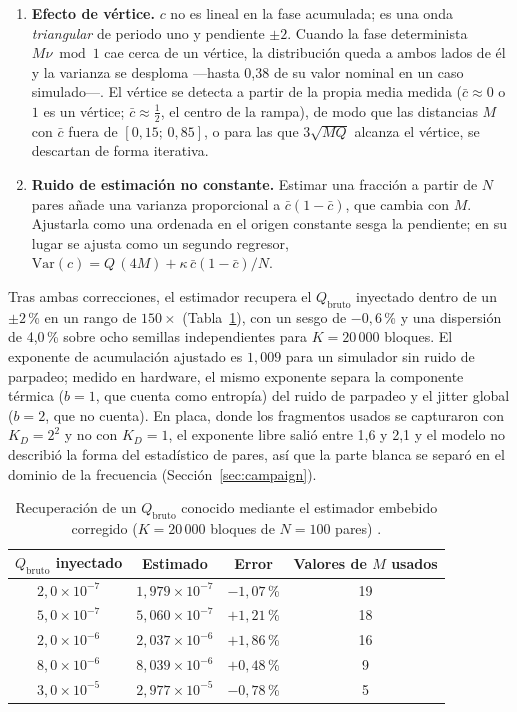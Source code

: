 \begin{enumerate}
\item \textbf{Efecto de vértice.} $c$ no es lineal en la fase acumulada;
es una onda \emph{triangular} de periodo uno y pendiente $\pm2$. Cuando la
fase determinista $M\nu \bmod 1$ cae cerca de un vértice, la distribución
queda a ambos lados de él y la varianza se desploma ---hasta 0,38 de su
valor nominal en un caso simulado---. El vértice se detecta a partir de la
propia media medida ($\bar c \approx 0$ o $1$ es un vértice;
$\bar c \approx \tfrac12$, el centro de la rampa), de modo que las
distancias $M$ con $\bar c$ fuera de $[0{,}15;\,0{,}85]$, o para las que
$3\sqrt{MQ}$ alcanza el vértice, se descartan de forma iterativa.
\item \textbf{Ruido de estimación no constante.} Estimar una fracción a
partir de $N$ pares añade una varianza proporcional a $\bar c(1-\bar c)$,
que cambia con $M$. Ajustarla como una ordenada en el origen constante
sesga la pendiente; en su lugar se ajusta como un segundo regresor,
$\mathrm{Var}(c) = Q\,(4M) + \kappa\,\bar c(1-\bar c)/N$.
\end{enumerate}

Tras ambas correcciones, el estimador recupera el $Q_{\mathrm{bruto}}$
inyectado dentro de un $\pm2$\,\% en un rango de $150\times$
(Tabla~\ref{tab:estimator}), con un sesgo de $-0{,}6$\,\% y una dispersión
de 4,0\,\% sobre ocho semillas independientes para $K=20\,000$ bloques. El
exponente de acumulación ajustado es $1{,}009$ para un simulador sin ruido
de parpadeo; medido en hardware, el mismo exponente separa la componente
térmica ($b=1$, que cuenta como entropía) del ruido de parpadeo y el
jitter global ($b=2$, que no cuenta). En placa, donde los fragmentos usados
se capturaron con $K_D = 2^2$ y no con $K_D = 1$, el exponente libre salió
entre 1,6 y 2,1 \meas{} y el modelo no describió la forma del estadístico
de pares, así que la parte blanca se separó en el dominio de la frecuencia
(Sección~\ref{sec:campaign}).

\begin{table}[htbp]
\centering
\caption{Recuperación de un $Q_{\mathrm{bruto}}$ conocido mediante el
estimador embebido corregido ($K=20\,000$ bloques de $N=100$ pares)
\simu{}.}
\label{tab:estimator}
\begin{tabular}{@{}cccc@{}}
\toprule
$Q_{\mathrm{bruto}}$ inyectado & Estimado & Error & Valores de $M$ usados \\
\midrule
$2{,}0\times10^{-7}$ & $1{,}979\times10^{-7}$ & $-1{,}07$\,\% & 19 \\
$5{,}0\times10^{-7}$ & $5{,}060\times10^{-7}$ & $+1{,}21$\,\% & 18 \\
$2{,}0\times10^{-6}$ & $2{,}037\times10^{-6}$ & $+1{,}86$\,\% & 16 \\
$8{,}0\times10^{-6}$ & $8{,}039\times10^{-6}$ & $+0{,}48$\,\% & 9 \\
$3{,}0\times10^{-5}$ & $2{,}977\times10^{-5}$ & $-0{,}78$\,\% & 5 \\
\bottomrule
\end{tabular}
\end{table}

